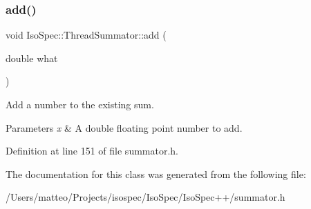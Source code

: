 \subsubsection{\texorpdfstring{add()}{add()}}
{\footnotesize\ttfamily void Iso\+Spec\+::\+Thread\+Summator\+::add (\begin{DoxyParamCaption}\item[{double}]{what }\end{DoxyParamCaption})\hspace{0.3cm}{\ttfamily [inline]}}



Add a number to the existing sum. 


\begin{DoxyParams}{Parameters}
{\em x} & A double floating point number to add. \\
\hline
\end{DoxyParams}


Definition at line 151 of file summator.\+h.



The documentation for this class was generated from the following file\+:\begin{DoxyCompactItemize}
\item 
/\+Users/matteo/\+Projects/isospec/\+Iso\+Spec/\+Iso\+Spec++/summator.\+h\end{DoxyCompactItemize}
